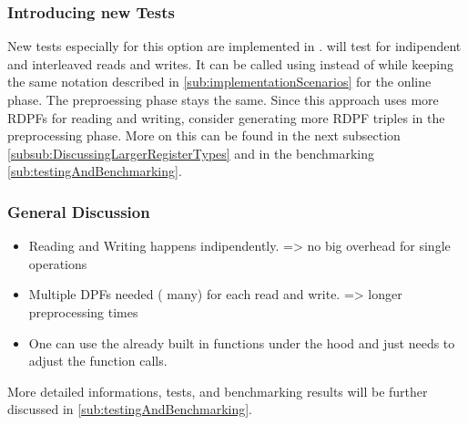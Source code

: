 \subsubsection*{Introducing new Tests} \label{subsub:IntroducingNewTests}
New tests especially for this option are implemented in .
 will test for indipendent and interleaved reads and writes.
It can be called using  instead of  while keeping the same notation described in \ref{sub:implementationScenarios} for the online phase.
The preproessing phase stays the same.
Since this approach uses more RDPFs for reading and writing, consider generating more RDPF triples in the preprocessing phase.
More on this can be found in the next subsection \ref{subsub:DiscussingLargerRegisterTypes} and in the benchmarking \ref{sub:testingAndBenchmarking}.

\subsubsection*{General Discussion} \label{subsub:DiscussingLargerRegisterTypes}
\begin{itemize}
    \item Reading and Writing happens indipendently. => no big overhead for single operations
    \item Multiple DPFs needed ( many) for each read and write. => longer preprocessing times
    \item One can use the already built in functions under the hood and just needs to adjust the function calls.
\end{itemize}
More detailed informations, tests, and benchmarking results will be further discussed in \ref{sub:testingAndBenchmarking}.